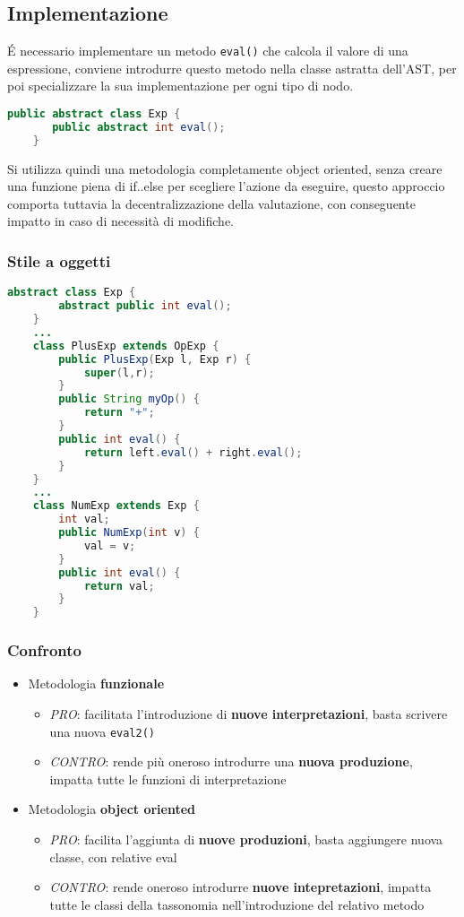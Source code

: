 \subsection{Implementazione}
É necessario implementare un metodo \texttt{eval()} che calcola il valore di una espressione, conviene introdurre questo metodo nella classe astratta dell'AST, per poi specializzare la sua implementazione per ogni tipo di nodo.

\begin{lstlisting}[language=java]
    public abstract class Exp {
       public abstract int eval();
    }
\end{lstlisting}

Si utilizza quindi una metodologia completamente object oriented, senza creare una funzione piena di if..else per scegliere l'azione da eseguire, questo approccio comporta tuttavia la decentralizzazione della valutazione, con conseguente impatto in caso di necessità di modifiche.

\subsubsection{Stile a oggetti}
\begin{lstlisting}[language=java]
    abstract class Exp {
        abstract public int eval();
    }
    ...
    class PlusExp extends OpExp {
        public PlusExp(Exp l, Exp r) {
            super(l,r);
        }
        public String myOp() {
            return "+";
        }
        public int eval() {
            return left.eval() + right.eval();
        }
    }
    ...
    class NumExp extends Exp {
        int val;
        public NumExp(int v) {
            val = v;
        }
        public int eval() {
            return val;
        }
    }
\end{lstlisting}

\subsubsection{Confronto}
\begin{itemize}
    \item Metodologia \textbf{funzionale}
    \begin{itemize}
        \item \textit{PRO}: facilitata l'introduzione di \textbf{nuove interpretazioni}, basta scrivere una nuova \texttt{eval2()}
        \item \textit{CONTRO}: rende più oneroso introdurre una \textbf{nuova produzione}, impatta tutte le funzioni di interpretazione
    \end{itemize}
    \item Metodologia \textbf{object oriented}
    \begin{itemize}
        \item \textit{PRO}: facilita l'aggiunta di \textbf{nuove produzioni}, basta aggiungere nuova classe, con relative eval
        \item \textit{CONTRO}: rende oneroso introdurre \textbf{nuove intepretazioni}, impatta tutte le classi della tassonomia nell'introduzione del relativo metodo
    \end{itemize}
\end{itemize}

